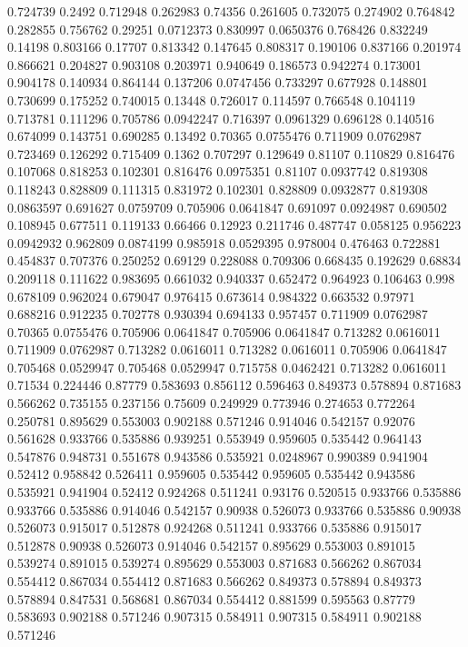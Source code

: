 0.724739 0.2492
0.712948 0.262983
0.74356 0.261605
0.732075 0.274902
0.764842 0.282855
0.756762 0.29251
0.0712373 0.830997
0.0650376 0.768426
0.832249 0.14198
0.803166 0.17707
0.813342 0.147645
0.808317 0.190106
0.837166 0.201974
0.866621 0.204827
0.903108 0.203971
0.940649 0.186573
0.942274 0.173001
0.904178 0.140934
0.864144 0.137206
0.0747456 0.733297
0.677928 0.148801
0.730699 0.175252
0.740015 0.13448
0.726017 0.114597
0.766548 0.104119
0.713781 0.111296
0.705786 0.0942247
0.716397 0.0961329
0.696128 0.140516
0.674099 0.143751
0.690285 0.13492
0.70365 0.0755476
0.711909 0.0762987
0.723469 0.126292
0.715409 0.1362
0.707297 0.129649
0.81107 0.110829
0.816476 0.107068
0.818253 0.102301
0.816476 0.0975351
0.81107 0.0937742
0.819308 0.118243
0.828809 0.111315
0.831972 0.102301
0.828809 0.0932877
0.819308 0.0863597
0.691627 0.0759709
0.705906 0.0641847
0.691097 0.0924987
0.690502 0.108945
0.677511 0.119133
0.66466 0.12923
0.211746 0.487747
0.058125 0.956223
0.0942932 0.962809
0.0874199 0.985918
0.0529395 0.978004
0.476463 0.722881
0.454837 0.707376
0.250252 0.69129
0.228088 0.709306
0.668435 0.192629
0.68834 0.209118
0.111622 0.983695
0.661032 0.940337
0.652472 0.964923
0.106463 0.998
0.678109 0.962024
0.679047 0.976415
0.673614 0.984322
0.663532 0.97971
0.688216 0.912235
0.702778 0.930394
0.694133 0.957457
0.711909 0.0762987
0.70365 0.0755476
0.705906 0.0641847
0.705906 0.0641847
0.713282 0.0616011
0.711909 0.0762987
0.713282 0.0616011
0.713282 0.0616011
0.705906 0.0641847
0.705468 0.0529947
0.705468 0.0529947
0.715758 0.0462421
0.713282 0.0616011
0.71534 0.224446
0.87779 0.583693
0.856112 0.596463
0.849373 0.578894
0.871683 0.566262
0.735155 0.237156
0.75609 0.249929
0.773946 0.274653
0.772264 0.250781
0.895629 0.553003
0.902188 0.571246
0.914046 0.542157
0.92076 0.561628
0.933766 0.535886
0.939251 0.553949
0.959605 0.535442
0.964143 0.547876
0.948731 0.551678
0.943586 0.535921
0.0248967 0.990389
0.941904 0.52412
0.958842 0.526411
0.959605 0.535442
0.959605 0.535442
0.943586 0.535921
0.941904 0.52412
0.924268 0.511241
0.93176 0.520515
0.933766 0.535886
0.933766 0.535886
0.914046 0.542157
0.90938 0.526073
0.933766 0.535886
0.90938 0.526073
0.915017 0.512878
0.924268 0.511241
0.933766 0.535886
0.915017 0.512878
0.90938 0.526073
0.914046 0.542157
0.895629 0.553003
0.891015 0.539274
0.891015 0.539274
0.895629 0.553003
0.871683 0.566262
0.867034 0.554412
0.867034 0.554412
0.871683 0.566262
0.849373 0.578894
0.849373 0.578894
0.847531 0.568681
0.867034 0.554412
0.881599 0.595563
0.87779 0.583693
0.902188 0.571246
0.907315 0.584911
0.907315 0.584911
0.902188 0.571246
